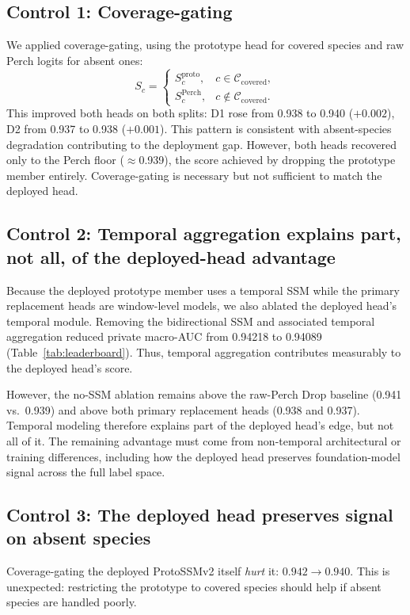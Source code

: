 \documentclass{ceurart}
\begin{document}
\subsection{Control 1: Coverage-gating}

We applied coverage-gating, using the prototype head for covered species and raw Perch logits for absent ones:
\[
S_c =
\begin{cases}
S_c^{\mathrm{proto}}, & c \in \mathcal{C}_{\mathrm{covered}},\\
S_c^{\mathrm{Perch}}, & c \notin \mathcal{C}_{\mathrm{covered}}.
\end{cases}
\]
This improved both heads on both splits:
D1 rose from 0.938 to 0.940 ($+0.002$), D2 from 0.937 to 0.938 ($+0.001$).
This pattern is consistent with absent-species degradation contributing to the deployment gap.
However, both heads recovered only to the Perch floor ($\approx$0.939), the score achieved by dropping the prototype member entirely.
Coverage-gating is necessary but not sufficient to match the deployed head.

\subsection{Control 2: Temporal aggregation explains part, not all, of the deployed-head advantage}

Because the deployed prototype member uses a temporal SSM while the primary replacement heads are window-level models, we also ablated the deployed head's temporal module. Removing the bidirectional SSM and associated temporal aggregation reduced private macro-AUC from 0.94218 to 0.94089 (Table~\ref{tab:leaderboard}). Thus, temporal aggregation contributes measurably to the deployed head's score.

However, the no-SSM ablation remains above the raw-Perch Drop baseline (0.941 vs.\ 0.939) and above both primary replacement heads (0.938 and 0.937). Temporal modeling therefore explains part of the deployed head's edge, but not all of it. The remaining advantage must come from non-temporal architectural or training differences, including how the deployed head preserves foundation-model signal across the full label space.

\subsection{Control 3: The deployed head preserves signal on absent species}

Coverage-gating the deployed ProtoSSMv2 itself \emph{hurt} it: $0.942 \rightarrow 0.940$.
This is unexpected: restricting the prototype to covered species should help if absent species are handled poorly.
\end{document}

